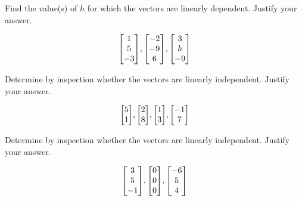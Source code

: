 \documentclass{../mathhomework}
\newenvironment{Mat}{\begin{bmatrix}}{\end{bmatrix}}
\begin{document}
\begin{problem}[1.7\#13]
    Find the value(s) of $h$ for which the vectors are linearly dependent. Justify your answer.

    \begin{equation*}
        \begin{Mat}
            1 \\ 5 \\ -3
        \end{Mat},
        \begin{Mat}
            -2 \\ -9 \\ 6
        \end{Mat},
        \begin{Mat}
            3 \\ h \\ -9
        \end{Mat}
    \end{equation*}
\end{problem}

\begin{problem}[1.7\#15]
    Determine by inspection whether the vectors are linearly independent. Justify your answer.

    \begin{equation*}
        \begin{Mat}
            5 \\ 1
        \end{Mat},
        \begin{Mat}
            2 \\ 8
        \end{Mat},
        \begin{Mat}
            1 \\ 3
        \end{Mat},
        \begin{Mat}
            -1 \\ 7
        \end{Mat}
    \end{equation*}
\end{problem}

\begin{problem}[1.7\#17]
    Determine by inspection whether the vectors are linearly independent. Justify your answer.

    \begin{equation*}
        \begin{Mat}
            3 \\ 5 \\ -1
        \end{Mat},
        \begin{Mat}
            0 \\ 0 \\ 0
        \end{Mat},
        \begin{Mat}
            -6 \\ 5 \\ 4
        \end{Mat}
    \end{equation*}
\end{problem}
\end{document}
